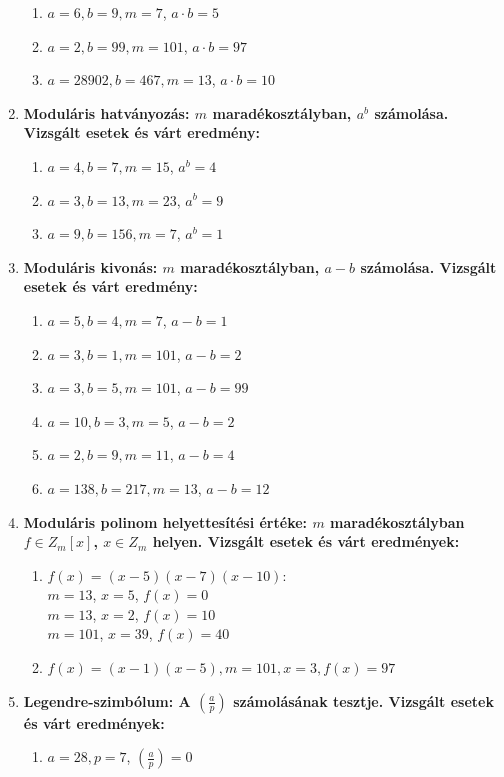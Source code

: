 \documentclass[hidelinks, 12pt]{article}
\begin{document}
\begin{enumerate}
\begin{enumerate}
		\item $a=6, b = 9, m = 7$, $a \cdot b = 5$
		\item $a=2, b = 99, m=101$, $a \cdot b = 97$
		\item $a=28902, b=467, m=13$, $a \cdot b = 10$
	\end{enumerate}
	\item  \bfseries Moduláris hatványozás:
	\normalfont $m$ maradékosztályban, $a^b$ számolása. Vizsgált esetek és várt eredmény:
	\begin{enumerate}
		\item  $a = 4, b = 7, m = 15$, $a^b=4$
		\item  $a = 3, b = 13, m = 23$, $a^b=9$
		\item  $a = 9, b = 156, m = 7$, $a^b=1$
	\end{enumerate}
	\item \bfseries Moduláris kivonás:
	\normalfont $m$ maradékosztályban, $a-b$ számolása. Vizsgált esetek és várt eredmény:
	\begin{enumerate}
		\item  $a = 5, b = 4, m = 7$, $a-b=1$
		\item  $a = 3, b = 1, m = 101$, $a-b=2$
		\item  $a = 3, b = 5, m = 101$, $a-b=99$
		\item $a = 10, b = 3, m = 5$, $a-b=2$
		\item  $a = 2, b = 9, m = 11$, $a-b=4$
		\item $a=138, b=217, m=13$, $a-b=12$
	\end{enumerate}
	\item \bfseries Moduláris polinom helyettesítési értéke:
	\normalfont $m$ maradékosztályban $f \in Z_m[x]$, $x \in Z_m$ helyen. Vizsgált esetek és várt eredmények:
	\begin{enumerate}
		\item $f(x)=(x-5)(x-7)(x-10)$:
		\\ $m=13$, $x=5$, $f(x) = 0$ 
		\\ $m=13$, $x=2$, $f(x) = 10$
		\\ $m=101$, $x=39$, $f(x) = 40$
		\item $f(x)=(x-1)(x-5), m = 101, x = 3, f(x) = 97$
	\end{enumerate}
	\item \bfseries Legendre-szimbólum:
	\normalfont A $\left({\frac{a}{p}}\right)$ számolásának tesztje. Vizsgált esetek és várt eredmények:
	\begin{enumerate}
		\item $a = 28, p = 7$, $\left({\frac{a}{p}}\right) = 0$

\end{enumerate}
\end{enumerate}
\end{document}
